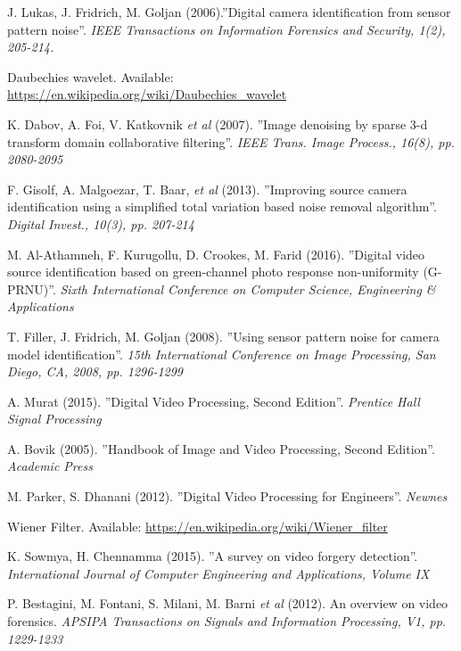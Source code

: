 \begin{thebibliography}{11}

J. Lukas, J. Fridrich, M. Goljan (2006).''Digital camera identification from sensor pattern noise''. \textit{IEEE Transactions on Information Forensics and Security, 1(2), 205-214.}

Daubechies wavelet. Available: \url{https://en.wikipedia.org/wiki/Daubechies\_wavelet}

K. Dabov, A. Foi, V. Katkovnik \textit{et al} (2007). ''Image denoising by sparse 3-d transform domain collaborative filtering''. \textit{IEEE Trans. Image Process., 16(8), pp. 2080-2095}

F. Gisolf, A. Malgoezar, T. Baar, \textit{et al} (2013). ''Improving source camera identification using a simplified total variation based noise removal algorithm''. \textit{Digital Invest., 10(3), pp. 207-214}

M. Al-Athamneh, F. Kurugollu, D. Crookes, M. Farid (2016). ''Digital video source identification based on green-channel photo response non-uniformity (G-PRNU)''. \textit{Sixth International Conference on Computer Science, Engineering \& Applications}

T. Filler, J. Fridrich, M. Goljan (2008). ''Using sensor pattern noise for camera model identification''. \textit{15th International Conference on Image Processing, San Diego, CA, 2008, pp. 1296-1299}

A. Murat (2015). ''Digital Video Processing, Second Edition''. \textit{Prentice Hall Signal Processing}

A. Bovik (2005). ''Handbook of Image and Video Processing, Second Edition''. \textit{Academic Press}

M. Parker, S. Dhanani (2012). ''Digital Video Processing for Engineers''. \textit{Newnes}

Wiener Filter. Available: \url{https://en.wikipedia.org/wiki/Wiener\_filter}

K. Sowmya, H. Chennamma (2015). ''A survey on video forgery detection''. \textit{International Journal of Computer Engineering and Applications, Volume IX}

P. Bestagini, M. Fontani, S. Milani, M. Barni \textit{et al} (2012). An overview on video forensics. \textit{APSIPA Transactions on Signals and Information Processing, V1, pp. 1229-1233}


\end{thebibliography}
